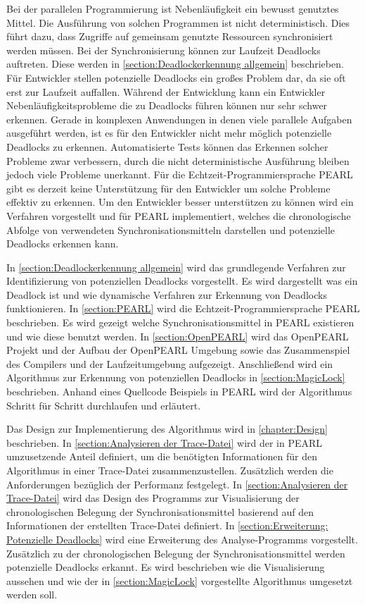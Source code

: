 Bei der parallelen Programmierung ist Nebenläufigkeit ein bewusst genutztes Mittel. Die Ausführung von solchen Programmen ist nicht deterministisch. Dies führt dazu, dass Zugriffe auf gemeinsam genutzte Ressourcen synchronisiert werden müssen. Bei der Synchronisierung können zur Laufzeit Deadlocks auftreten. Diese werden in \cref{section:Deadlockerkennung allgemein} beschrieben. Für Entwickler stellen potenzielle Deadlocks ein großes Problem dar, da sie oft erst zur Laufzeit auffallen. Während der Entwicklung kann ein Entwickler Nebenläufigkeitsprobleme die zu Deadlocks führen können nur sehr schwer erkennen. Gerade in komplexen Anwendungen in denen viele parallele Aufgaben ausgeführt werden, ist es für den Entwickler nicht mehr möglich potenzielle Deadlocks zu erkennen. Automatisierte Tests können das Erkennen solcher Probleme zwar verbessern, durch die nicht deterministische Ausführung bleiben jedoch viele Probleme unerkannt. Für die Echtzeit-Programmiersprache PEARL gibt es derzeit keine Unterstützung für den Entwickler um solche Probleme effektiv zu erkennen. Um den Entwickler besser unterstützen zu können wird ein Verfahren vorgestellt und für PEARL implementiert, welches die chronologische Abfolge von verwendeten Synchronisationsmitteln darstellen und potenzielle Deadlocks erkennen kann.

In \cref{section:Deadlockerkennung allgemein} wird das grundlegende Verfahren zur Identifizierung von potenziellen Deadlocks vorgestellt. Es wird dargestellt was ein Deadlock ist und wie dynamische Verfahren zur Erkennung von Deadlocks funktionieren. In \cref{section:PEARL} wird die Echtzeit-Programmiersprache PEARL \autocite{PEARL} beschrieben. Es wird gezeigt welche Synchronisationsmittel in PEARL existieren und wie diese benutzt werden. In \cref{section:OpenPEARL} wird das OpenPEARL Projekt und der Aufbau der OpenPEARL Umgebung sowie das Zusammenspiel des Compilers und der Laufzeitumgebung aufgezeigt. Anschließend wird ein Algorithmus zur Erkennung von potenziellen Deadlocks in \cref{section:MagicLock} beschrieben. Anhand eines Quellcode Beispiels in PEARL wird der Algorithmus Schritt für Schritt durchlaufen und erläutert. 

Das Design zur Implementierung des Algorithmus wird in \cref{chapter:Design} beschrieben. In \cref{section:Analysieren der Trace-Datei} wird der in PEARL umzusetzende Anteil definiert, um die benötigten Informationen für den Algorithmus in einer Trace-Datei zusammenzustellen. Zusätzlich werden die Anforderungen bezüglich der Performanz festgelegt. In \cref{section:Analysieren der Trace-Datei} wird das Design des Programms zur Visualisierung der chronologischen Belegung der Synchronisationsmittel basierend auf den Informationen der erstellten Trace-Datei definiert. In \cref{section:Erweiterung: Potenzielle Deadlocks} wird eine Erweiterung des Analyse-Programms vorgestellt. Zusätzlich zu der chronologischen Belegung der Synchronisationsmittel werden potenzielle Deadlocks erkannt. Es wird beschrieben wie die Visualisierung aussehen und wie der in \cref{section:MagicLock} vorgestellte Algorithmus umgesetzt werden soll.

